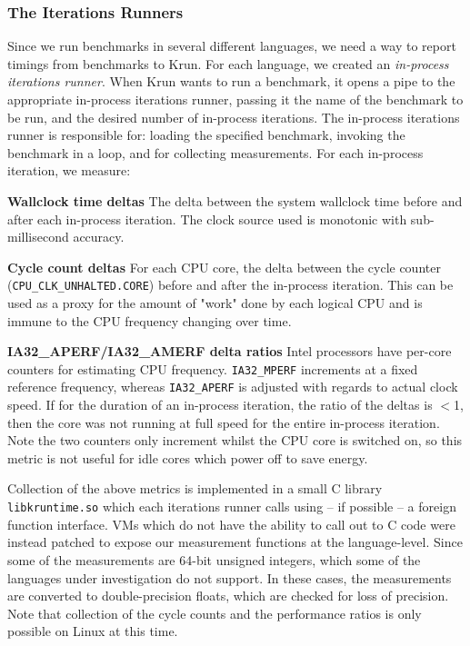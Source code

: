 \documentclass[preprint,numbers,10pt]{sigplanconf}
\newcommand{\krun}{Krun\xspace}
\begin{document}
\subsubsection{The Iterations Runners}

Since we run benchmarks in several different languages, we need a way to report
timings from benchmarks to \krun. For each language, we created an
\emph{in-process iterations runner}. When \krun wants to run a benchmark, it opens a pipe to the
appropriate in-process iterations runner, passing it the name of the
benchmark to be run, and the desired number of in-process iterations. The
in-process iterations runner is responsible for: loading the specified
benchmark, invoking the benchmark in a loop, and for collecting measurements.
For each in-process iteration, we measure:

\textbf{Wallclock time deltas} The delta between the system wallclock time before
    and after each in-process iteration. The clock source used is monotonic
    with sub-millisecond accuracy.

\textbf{Cycle count deltas} For each CPU core, the delta between the
    cycle counter (\texttt{CPU\_CLK\_UNHALTED.CORE}) before and after the
    in-process iteration. This can be used as a proxy for the amount of "work"
    done by each logical CPU and is immune to the CPU frequency changing over
    time.

\textbf{IA32\_APERF/IA32\_AMERF delta ratios} Intel processors have
    per-core counters for estimating CPU frequency. \texttt{IA32\_MPERF}
    increments at a fixed reference frequency, whereas \texttt{IA32\_APERF} is
    adjusted with regards to actual clock speed. If for the duration of an
    in-process iteration, the ratio of the deltas is $<$1, then the core was
    not running at full speed for the entire in-process iteration. Note the two
    counters only increment whilst the CPU core is switched on, so this metric
    is not useful for idle cores which power off to save energy.

Collection of the above metrics is implemented in a small C library
\texttt{libkruntime.so} which each iterations runner calls using -- if possible
-- a foreign function interface. VMs which do not have the ability to call out
to C code were instead patched to expose our measurement functions at the
language-level. Since some of the measurements are 64-bit unsigned integers,
which some of the languages under investigation do not support. In these cases,
the measurements are converted to double-precision floats, which are checked
for loss of precision. Note that collection of the cycle counts and the
performance
ratios is only possible on Linux at this time.
\end{document}
